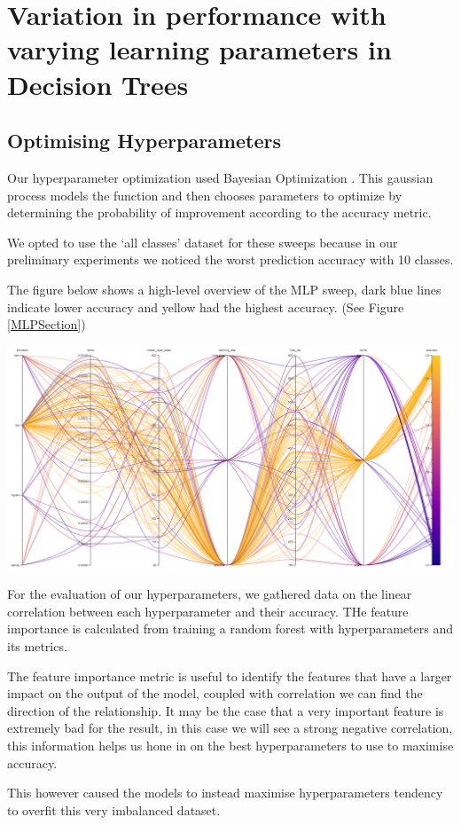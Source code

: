 \documentclass[11pt]{article}
\begin{document}
\newpage
\section{Variation in performance with varying learning parameters in Decision Trees}
\subsection{Optimising Hyperparameters}
\cite{SklearnTreeDecisionTreeClassifier}

Our hyperparameter optimization used Bayesian Optimization \cite{Configuration}. This gaussian process models the function and then chooses parameters to optimize by determining the probability of improvement according to the accuracy metric. 
\par
We opted to use the ‘all classes’ dataset for these sweeps because in our preliminary experiments we noticed the worst prediction accuracy with 10 classes.

The figure below shows a high-level overview of the MLP sweep, dark blue lines indicate lower accuracy and yellow had the highest accuracy. (See Figure \ref{MLPSection})

\begin{center}
  \includegraphics [width = \textwidth, height = 0.3\textheight, keepaspectratio]{Images/MLP ParallelCoordGraph.png}
\end{center}

For the evaluation of our hyperparameters, we gathered data on the linear correlation between each hyperparameter and their accuracy. THe feature importance is calculated from training a random forest with hyperparameters and its metrics. \cite{ParameterImportance}
\par
The feature importance metric is useful to identify the features that have a larger impact on the output of the model, coupled with correlation we can find the direction of the relationship. It may be the case that a very important feature is extremely bad for the result, in this case we will see a strong negative correlation, this information helps us hone in on the best hyperparameters to use to maximise accuracy.
\par
This however caused the models to instead maximise hyperparameters tendency to overfit this very imbalanced dataset.
\newpage
\end{document}
